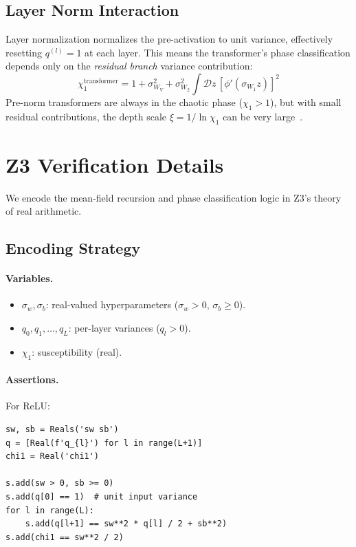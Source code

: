 \documentclass[10pt]{article}
\begin{document}
\subsection{Layer Norm Interaction}

Layer normalization normalizes the pre-activation to unit variance, effectively resetting $q^{(l)} = 1$ at each layer.
This means the transformer's phase classification depends only on the \emph{residual branch} variance contribution:
\begin{equation}
    \chi_1^{\text{transformer}} = 1 + \sigma_{W_V}^2 + \sigma_{W_2}^2 \int \mathcal{D}z\, [\phi'(\sigma_{W_1} z)]^2
\end{equation}
Pre-norm transformers are always in the chaotic phase ($\chi_1 > 1$), but with small residual contributions, the depth scale $\xi = 1/\ln \chi_1$ can be very large~\cite{noci2022signal}.
\section{Z3 Verification Details}
\label{app:z3}

We encode the mean-field recursion and phase classification logic in Z3's theory of real arithmetic.

\subsection{Encoding Strategy}

\paragraph{Variables.}
\begin{itemize}[nosep]
    \item $\sigma_w, \sigma_b$: real-valued hyperparameters ($\sigma_w > 0$, $\sigma_b \geq 0$).
    \item $q_0, q_1, \ldots, q_L$: per-layer variances ($q_l > 0$).
    \item $\chi_1$: susceptibility (real).
\end{itemize}

\paragraph{Assertions.}
For ReLU:
\begin{verbatim}
sw, sb = Reals('sw sb')
q = [Real(f'q_{l}') for l in range(L+1)]
chi1 = Real('chi1')

s.add(sw > 0, sb >= 0)
s.add(q[0] == 1)  # unit input variance
for l in range(L):
    s.add(q[l+1] == sw**2 * q[l] / 2 + sb**2)
s.add(chi1 == sw**2 / 2)
\end{verbatim}
\end{document}
